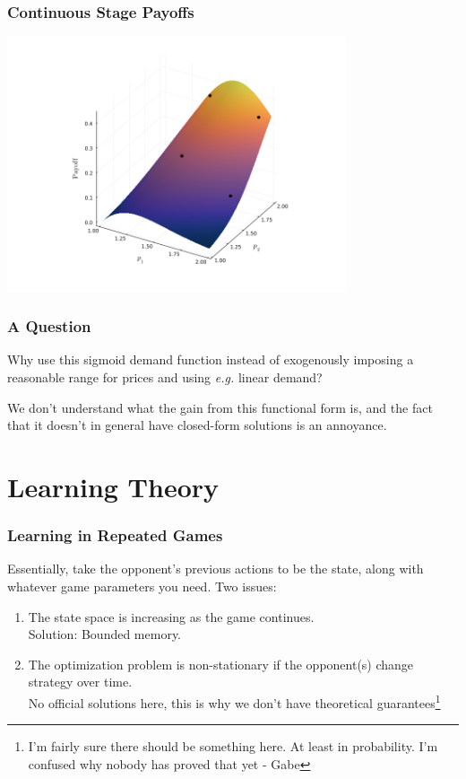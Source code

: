 \documentclass{beamer}
\begin{document}
\begin{frame}\frametitle{Continuous Stage Payoffs}
	\includegraphics[width=10cm]{cont_plot.png}
\end{frame}

\begin{frame}\frametitle{A Question}
	Why use this sigmoid demand function instead of exogenously imposing a reasonable range for prices and using \emph{e.g.} linear demand?
	
	We don't understand what the gain from this functional form is, and the fact that it doesn't in general have closed-form solutions is an annoyance.
\end{frame}

\section{Learning Theory}

\begin{frame}\frametitle{Learning in Repeated Games}
	Essentially, take the opponent's previous actions to be the state, along with whatever game parameters you need. Two issues:
	\begin{enumerate}
		\item The state space is increasing as the game continues. \\ Solution: Bounded memory. 
		\item The optimization problem is non-stationary if the opponent(s) change strategy over time. \\ No official solutions here, this is why we don't have theoretical guarantees\footnote{I'm fairly sure there should be something here. At least in probability. I'm confused why nobody has proved that yet - Gabe}
	\end{enumerate}
\end{frame}
\end{document}

